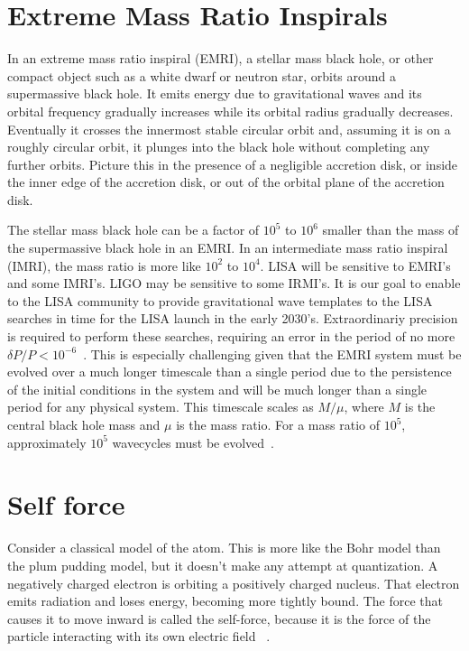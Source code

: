 \section{Extreme Mass Ratio Inspirals}
In an extreme mass ratio inspiral (EMRI), a stellar mass black hole, or other compact object such as a white dwarf or neutron star, orbits around a supermassive black hole. It emits energy due to gravitational waves and its orbital frequency gradually increases while its orbital radius gradually decreases. Eventually it crosses the innermost stable circular orbit and, assuming it is on a roughly circular orbit, it plunges into the black hole without completing any further orbits. Picture this in the presence of a negligible accretion disk, or inside the inner edge of the accretion disk, or out of the orbital plane of the accretion disk. 

The stellar mass black hole can be a factor of $10^5$ to $10^6$ smaller than the mass of the supermassive black hole in an EMRI. In an intermediate mass ratio inspiral (IMRI), the mass ratio is more like $10^2$ to $10^4$. LISA will be sensitive to EMRI's and some IMRI's. LIGO may be sensitive to some IRMI's. It is our goal to enable to the LISA community to provide gravitational wave templates to the LISA searches in time for the LISA launch in the early 2030's. Extraordinariy precision is required to perform these searches, requiring an error in the period of no more $\delta P/P<10^{-6}$~\cite{LISA02062017}. This is especially challenging given that the EMRI system must be evolved over a much longer timescale than a single period due to the persistence of the initial conditions in the system and will be much longer than a single period for any physical system. This timescale scales as $M/\mu$, where $M$ is the central black hole mass and $\mu$ is the mass ratio. For a mass ratio of $10^5$, approximately $10^5$ wavecycles must be evolved~\cite{LISA02062017}.

\section{Self force}

Consider a classical model of the atom. This is more like the Bohr model than the plum pudding model, but it doesn't make any attempt at quantization. A negatively charged electron is orbiting a positively charged nucleus. That electron emits radiation and loses energy, becoming more tightly bound. The force that causes it to move inward is called the self-force, because it is the force of the particle interacting with its own electric field ~\cite{dirac1938}.

